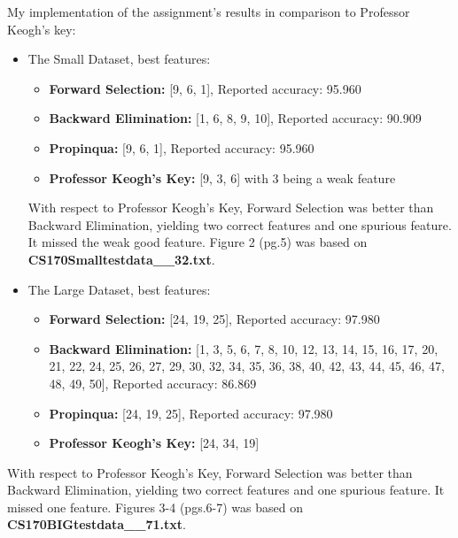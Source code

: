 \documentclass{article}
\begin{document}
My implementation of the assignment's results in comparison to Professor Keogh's
key:
\begin{itemize}
  
\item The Small Dataset, best features:
  \begin{itemize}
  \item \textbf{Forward Selection:} [9, 6, 1], Reported accuracy: 95.960%
  \item \textbf{Backward Elimination:} [1, 6, 8, 9, 10], Reported accuracy: 90.909%
  \item \textbf{Propinqua:} [9, 6, 1], Reported accuracy: 95.960%
  \item \textbf{Professor Keogh's Key:} [9, 3, 6] with 3 being a weak feature
  \end{itemize}
   With respect to Professor Keogh's Key, Forward Selection was better
   than Backward Elimination, yielding two correct features and one spurious
   feature. It missed the weak good feature. Figure 2 (pg.5) was based on
   \textbf{CS170Smalltestdata\_\_32.txt}. 
  
\item The Large Dataset, best features:
  \begin{itemize}
  \item \textbf{Forward Selection:} [24, 19, 25], Reported accuracy: 97.980%
  \item \textbf{Backward Elimination:} [1, 3, 5, 6, 7, 8, 10, 12, 13, 14, 15,
    16, 17, 20, 21, 22, 24, 25, 26, 27, 29, 30, 32, 34, 35, 36, 38, 40, 42, 43,
    44, 45, 46, 47, 48, 49, 50], Reported accuracy: 86.869%
  \item \textbf{Propinqua:} [24, 19, 25], Reported accuracy: 97.980%
  \item \textbf{Professor Keogh's Key:} [24, 34, 19]
    \end{itemize}
\end{itemize}
  With respect to Professor Keogh's Key, Forward Selection was better than
  Backward Elimination, yielding two correct features and one spurious feature.
  It missed one feature. Figures 3-4 (pgs.6-7) was based on
  \textbf{CS170BIGtestdata\_\_71.txt}. 
\end{document}
